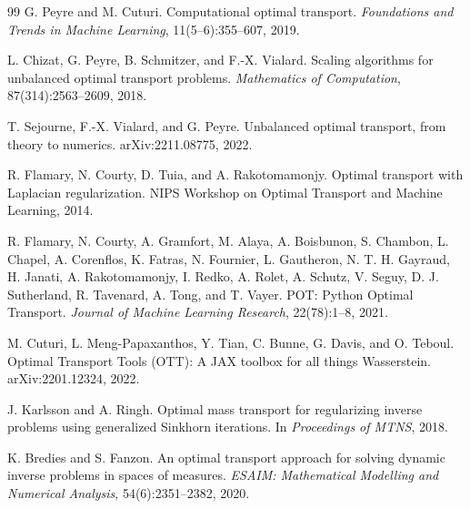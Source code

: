 \documentclass[11pt]{article}
\numberwithin{equation}{section}
\begin{document}
\begin{thebibliography}{99}
G. Peyre and M. Cuturi.
\newblock Computational optimal transport.
\newblock \emph{Foundations and Trends in Machine Learning}, 11(5--6):355--607, 2019.

L. Chizat, G. Peyre, B. Schmitzer, and F.-X. Vialard.
\newblock Scaling algorithms for unbalanced optimal transport problems.
\newblock \emph{Mathematics of Computation}, 87(314):2563--2609, 2018.

T. Sejourne, F.-X. Vialard, and G. Peyre.
\newblock Unbalanced optimal transport, from theory to numerics.
\newblock arXiv:2211.08775, 2022.

R. Flamary, N. Courty, D. Tuia, and A. Rakotomamonjy.
\newblock Optimal transport with Laplacian regularization.
\newblock NIPS Workshop on Optimal Transport and Machine Learning, 2014.

R. Flamary, N. Courty, A. Gramfort, M. Alaya, A. Boisbunon, S. Chambon, L. Chapel, A. Corenflos, K. Fatras, N. Fournier, L. Gautheron, N. T. H. Gayraud, H. Janati, A. Rakotomamonjy, I. Redko, A. Rolet, A. Schutz, V. Seguy, D. J. Sutherland, R. Tavenard, A. Tong, and T. Vayer.
\newblock POT: Python Optimal Transport.
\newblock \emph{Journal of Machine Learning Research}, 22(78):1--8, 2021.

M. Cuturi, L. Meng-Papaxanthos, Y. Tian, C. Bunne, G. Davis, and O. Teboul.
\newblock Optimal Transport Tools (OTT): A JAX toolbox for all things Wasserstein.
\newblock arXiv:2201.12324, 2022.

J. Karlsson and A. Ringh.
\newblock Optimal mass transport for regularizing inverse problems using generalized Sinkhorn iterations.
\newblock In \emph{Proceedings of MTNS}, 2018.

K. Bredies and S. Fanzon.
\newblock An optimal transport approach for solving dynamic inverse problems in spaces of measures.
\newblock \emph{ESAIM: Mathematical Modelling and Numerical Analysis}, 54(6):2351--2382, 2020.

\end{thebibliography}
\end{document}
